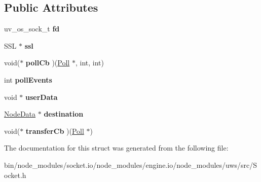 \subsection*{Public Attributes}
\begin{DoxyCompactItemize}
\item 
\mbox{\label{structu_s_1_1_transfer_data_a44abbb390c330c28d9d9978c4a1d3738}} 
uv\+\_\+os\+\_\+sock\+\_\+t {\bfseries fd}
\item 
\mbox{\label{structu_s_1_1_transfer_data_ab5f00a4ff96f2449fdb95cd2119d12e1}} 
S\+SL $\ast$ {\bfseries ssl}
\item 
\mbox{\label{structu_s_1_1_transfer_data_afb2a25a016e2d6f726fc9e97f87d4af4}} 
void($\ast$ {\bfseries poll\+Cb} )(\mbox{\hyperlink{struct_poll}{Poll}} $\ast$, int, int)
\item 
\mbox{\label{structu_s_1_1_transfer_data_a267e4730c68d4f74ce21d31918e610d9}} 
int {\bfseries poll\+Events}
\item 
\mbox{\label{structu_s_1_1_transfer_data_af3ac1b3143ed2f76b76e4bc4c923817f}} 
void $\ast$ {\bfseries user\+Data}
\item 
\mbox{\label{structu_s_1_1_transfer_data_a6dacc0980483bb29a9c1f99380222978}} 
\mbox{\hyperlink{structu_s_1_1_node_data}{Node\+Data}} $\ast$ {\bfseries destination}
\item 
\mbox{\label{structu_s_1_1_transfer_data_a5c5d304c57a4e76bd905b5c784472ec6}} 
void($\ast$ {\bfseries transfer\+Cb} )(\mbox{\hyperlink{struct_poll}{Poll}} $\ast$)
\end{DoxyCompactItemize}


The documentation for this struct was generated from the following file\+:\begin{DoxyCompactItemize}
\item 
bin/node\+\_\+modules/socket.\+io/node\+\_\+modules/engine.\+io/node\+\_\+modules/uws/src/Socket.\+h\end{DoxyCompactItemize}
